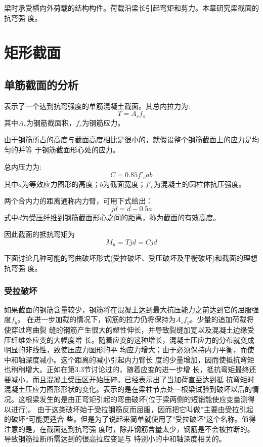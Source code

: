 \documentclass[12pt,a4paper]{book}
\begin{document}
梁时承受横向外荷载的结构构件。荷载沿梁长引起弯矩和剪力。本章研究梁截面的抗弯强
度。

\section{矩形截面}

\subsection{单筋截面的分析}

表示了一个达到抗弯强度的单筋混凝土截面。其总内拉力为:
\begin{equation}
  \label{eq:11}
  T=A_sf_s
\end{equation}
其中$A_s$为钢筋截面积，$f_s$为钢筋应力。

由于钢筋所占的高度与截面高度相比是很小的，就假设整个钢筋截面上的应力是均匀的并等
于钢筋截面形心处的应力。

总内压力为:
\begin{equation}
  \label{eq:12}
  C=0.85f'_cab
\end{equation}
其中$a$为等效应力图形的高度；$b$为截面宽度；$f'_c$为混凝土的圆柱体抗压强度。

两个合内力的距离通称内力臂，可用下式给出：
\begin{equation}
  \label{eq:13}
  jd=d-0.5a
\end{equation}
式中$d$为受压纤维到钢筋截面形心之间的距离，称为截面的有效高度。

因此截面的抵抗弯矩为
\begin{equation}
  \label{eq:14}
  M_u=Tjd=Cjd
\end{equation}

下面讨论几种可能的弯曲破坏形式(受拉破坏、受压破坏及平衡破坏)和截面的理想抗弯强
度。

\subsubsection{受拉破坏}

如果截面的钢筋含量较少，钢筋将在混凝土达到最大抗压能力之前达到它的屈服强度$f_y$。
在进一步加载的情况下，钢筋的拉力仍将保持为$A_sf_y$。少量的追加荷载将使穿过弯曲裂
缝的钢筋产生很大的塑性伸长，并导致裂缝加宽以及混凝土边缘受压纤维处应变的大幅度增
长。随着应变的这种增长，混凝土压应力的分布就变成明显的非线性，致使压应力图形的平
均应力增大；由于必须保持内力平衡，而使中和轴深度减小。这个距离的减小引起内力臂长
度的少量增加，因而使抵抗弯矩也稍稍增大。正如在第3.3节讨论过的，随着应变的进一步增
长，抵抗弯矩最终还要减小，而且混凝土受压区开始压碎。已经表示出了当加荷直至达到抵
抗弯矩时混凝土压应力图形形状的变化。表示的是在梁柱节点处一根梁试验到破坏以后的情
况。这根梁发生的是由正弯矩引起的弯曲破坏(位于梁两侧的短销能使应变量测得以进行)。
由于这类破坏始于受拉钢筋反而屈服，因而把它叫做”主要由受拉引起的破坏“可能更适合
些。但是为了说起来简单就使用了"受拉破坏"这个名称。值得注意的是，在截面达到抗弯强
度时，除非钢筋含量太少，钢筋是不会被拉断的。导致钢筋拉断所需达到的很高拉应变是与
特别小的中和轴深度相关的。
\end{document}
